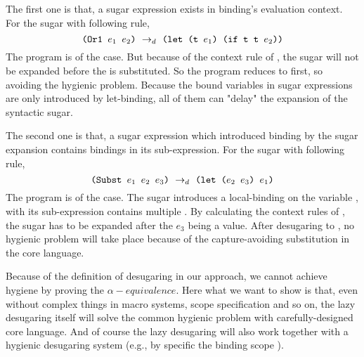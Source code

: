 The first one is that, a sugar expression exists in binding's evaluation context. For the sugar  with following rule,
\[\texttt{(Or1~$e_1$~$e_2$)} ~\rightarrow_d~ \texttt{(let (t $e_1$) (if t t $e_2$))}\]
The program  is of the case. But because of the context rule of , the sugar  will not be expanded before the  is substituted. So the program reduces to  first, so avoiding the hygienic problem. Because the bound variables in sugar expressions are only introduced by let-binding, all of them can "delay" the expansion of the syntactic sugar.

The second one is that, a sugar expression which introduced binding by the sugar expansion contains bindings in its sub-expression. For the sugar  with following rule,
\[
\texttt{(Subst $e_1$ $e_2$ $e_3$)} ~\rightarrow_d~ \texttt{(let ($e_2$ $e_3$) $e_1$)}
\]
The program  is of the case. The sugar introduces a local-binding on the variable , with its sub-expression contains multiple . By calculating the context rules of , the sugar has to be expanded after the $e_3$ being a value. After desugaring to ,  no hygienic problem will take place because of the capture-avoiding substitution in the core language.

Because of the definition of desugaring in our approach, we cannot achieve hygiene by proving the $\alpha-equivalence$.
Here what we want to show is that, even without complex things in macro systems, scope specification and so on, the lazy desugaring itself will solve the common hygienic problem with carefully-designed core language. And of course the lazy desugaring will also work together with a hygienic desugaring system (e.g., by specific the binding scope \cite{10.5555/1792878.1792884}).
